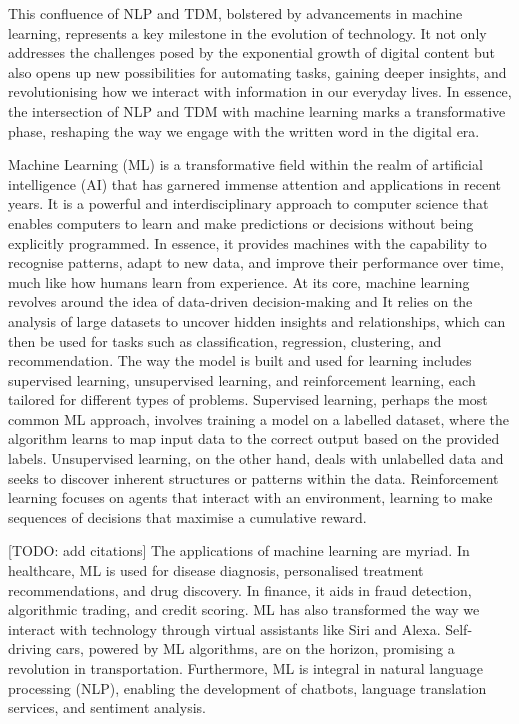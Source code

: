 This confluence of NLP and TDM, bolstered by advancements in machine learning, represents a key milestone in the evolution of technology. It not only addresses the challenges posed by the exponential growth of digital content but also opens up new possibilities for automating tasks, gaining deeper insights, and revolutionising how we interact with information in our everyday lives. In essence, the intersection of NLP and TDM with machine learning marks a transformative phase, reshaping the way we engage with the written word in the digital era.


Machine Learning (ML) is a transformative field within the realm of artificial intelligence (AI) that has garnered immense attention and applications in recent years. It is a powerful and interdisciplinary approach to computer science that enables computers to learn and make predictions or decisions without being explicitly programmed. In essence, it provides machines with the capability to recognise patterns, adapt to new data, and improve their performance over time, much like how humans learn from experience.
At its core, machine learning revolves around the idea of data-driven decision-making and  It relies on the analysis of large datasets to uncover hidden insights and relationships, which can then be used for tasks such as classification, regression, clustering, and recommendation. 
The way the model is built and used for learning includes supervised learning, unsupervised learning, and reinforcement learning, each tailored for different types of problems.
Supervised learning, perhaps the most common ML approach, involves training a model on a labelled dataset, where the algorithm learns to map input data to the correct output based on the provided labels. 
Unsupervised learning, on the other hand, deals with unlabelled data and seeks to discover inherent structures or patterns within the data. Reinforcement learning focuses on agents that interact with an environment, learning to make sequences of decisions that maximise a cumulative reward.

[TODO: add citations]
The applications of machine learning are myriad. In healthcare, ML is used for disease diagnosis, personalised treatment recommendations, and drug discovery. In finance, it aids in fraud detection, algorithmic trading, and credit scoring. ML has also transformed the way we interact with technology through virtual assistants like Siri and Alexa. Self-driving cars, powered by ML algorithms, are on the horizon, promising a revolution in transportation. Furthermore, ML is integral in natural language processing (NLP), enabling the development of chatbots, language translation services, and sentiment analysis.

